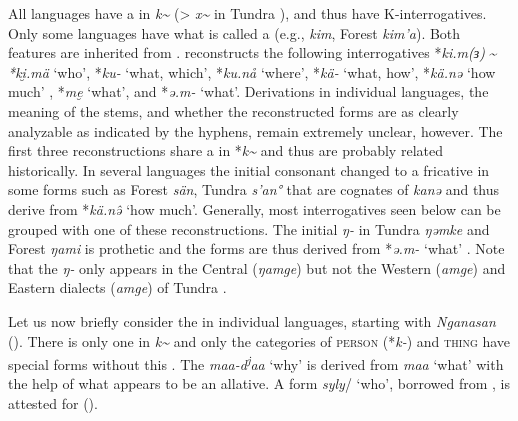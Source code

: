 All  languages have a  in \textit{k{\textasciitilde}} (> \textit{x{\textasciitilde}} in Tundra ), and thus have K-interrogatives. Only some languages have what is called a  (e.g.,  \textit{kim}, Forest  \textit{kim’a}). Both features are inherited from . \cite[15, 62f., 69, 75, 91]{Janhunen1977} reconstructs the following  interrogatives *\textit{ki.m(ɜ)} {\textasciitilde} \textit{*ki̮.}\textit{mä} ‘who’, *\textit{ku-} ‘what, which’, *\textit{ku.nå} ‘where’, *\textit{kä-} ‘what, how’, *\textit{kä.nə} ‘how much’ , *\textit{m{e̮}} ‘what’, and *\textit{ə.m-} ‘what’. Derivations in individual languages, the meaning of the stems, and whether the reconstructed forms are as clearly analyzable as indicated by the hyphens, remain extremely unclear, however. The first three reconstructions share a  in *\textit{k{\textasciitilde}} and thus are probably related historically. In several languages the initial consonant changed to a fricative in some forms such as Forest  \textit{sän}, Tundra  \textit{s’an°} that are cognates of  \textit{kanə} and thus derive from *\textit{kä.n\^ə} ‘how much’. Generally, most interrogatives seen below can be grouped with one of these reconstructions. The initial \textit{ŋ-} in Tundra  \textit{ŋəmke} and Forest  \textit{ŋami} is prothetic \citep[466]{Janhunen1998} and the forms are thus derived from *\textit{ə.m-} ‘what’ \citep[15]{Janhunen1977}. Note that the \textit{ŋ-} only appears in the Central (\textit{ŋamge}) but not the Western (\textit{amge}) and Eastern dialects (\textit{amge}) of Tundra  \citep[93]{Mus2015a}.

Let us now briefly consider the  in individual  languages, starting with \textit{Nganasan} (). There is only one  in \textit{k{\textasciitilde}} and only the categories of \textsc{person} (*\textit{k-}) and \textsc{thing} have special forms without this . The  \textit{maa-d\textsuperscript{j}}\textit{aa} ‘why’ is derived from \textit{maa} ‘what’ with the help of what appears to be an allative. A form \textit{syly}/ ‘who’, borrowed from , is attested for  ().

